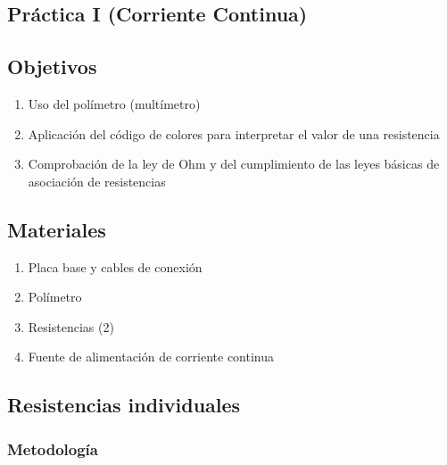 \documentclass[11pt]{report}
\begin{document}
\begin{refsection}
\chapter{Práctica I (Corriente Continua)}
\section{\textbf{Objetivos}}
\begin{enumerate}%
    \item Uso del polímetro (multímetro)
    \item Aplicación del código de colores para interpretar el valor de una resistencia
    \item Comprobación de la ley de Ohm y del cumplimiento de las leyes básicas de asociación de resistencias
\end{enumerate}

\section{\textbf{Materiales}}
\begin{enumerate}%
    \item Placa base y cables de conexión
    \item Polímetro
    \item Resistencias (2)
    \item Fuente de alimentación de corriente continua
\end{enumerate}

\section{\textbf{Resistencias individuales}}
\subsection{Metodología}


\end{refsection}
\end{document}
